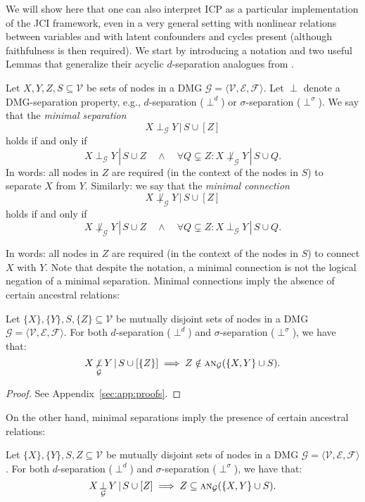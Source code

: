 \documentclass[twoside,11pt]{article}
\DeclareMathOperator*{\SEP}{\perp}
\DeclareMathOperator*{\nSEP}{\not\perp}
\newcommand\sep[4]{{#1} \SEP_{#4} {#2} \given {#3}}
\newcommand\con[4]{{#1} \nSEP_{#4} {#2} \given {#3}}
\newcommand\C[1]{\mathcal{#1}}
\newcommand\mathbfsc[1]{\text{\normalfont\scshape#1}}
\newcommand\ansub[2]{\mathbfsc{an}_{#1}(#2)}
\newcommand\given{\,|\,}
\begin{document}
We will show here that one can also interpret ICP as a particular implementation of the JCI framework,
even in a very general setting with nonlinear relations between variables and with latent confounders
and cycles present (although faithfulness is then required).
We start by introducing a notation and two useful Lemmas that generalize their acyclic $d$-separation
analogues from \citep{ClaassenHeskes2011}.
\begin{definition}
Let $X,Y,Z,S \subseteq \C{V}$ be sets of nodes in a DMG $\C{G} = \langle \C{V},\C{E},\C{F} \rangle$. 
Let $\SEP$ denote a DMG-separation property,
  e.g., $d$-separation ($\SEP^d$) or $\sigma$-separation ($\SEP^\sigma$). We say that the \emph{minimal separation}
  $$\sep{X}{Y}{S \cup [Z]}{\C{G}}$$
holds if and only if
  $$\sep{X}{Y}{S \cup Z}{\C{G}} \quad\land\quad \forall Q \subsetneq Z: \con{X}{Y}{S \cup Q}{\C{G}}.$$
In words: all nodes in $Z$ are required (in the context of the nodes in $S$) to separate $X$ from $Y$.
Similarly: we say that the \emph{minimal connection}
  $$\con{X}{Y}{S \cup [Z]}{\C{G}}$$
holds if and only if
  $$\con{X}{Y}{S \cup Z}{\C{G}}\quad\land\quad \forall Q \subsetneq Z: \sep{X}{Y}{S \cup Q}{\C{G}}.$$
\end{definition}
In words: all nodes in $Z$ are required (in the context of the nodes in $S$) to connect $X$ with $Y$.
Note that despite the notation, a minimal connection is not the logical negation of a minimal separation.
Minimal connections imply the absence of certain ancestral relations:
\newcommand\cmdLemmaMinCon{%
Let $\{X\},\{Y\},S,\{Z\} \subseteq \C{V}$ be mutually disjoint sets of nodes in a DMG $\C{G} = \langle \C{V},\C{E},\C{F} \rangle$.
For both $d$-separation ($\SEP^d$) and $\sigma$-separation ($\SEP^\sigma$), we have that:
$$\con{X}{Y}{S \cup [\{Z\}]}{\C{G}} \implies Z \notin \ansub{\C{G}}{\{X, Y\} \cup S}.$$
}
\begin{lemma}\label{lemm:min_con}
\cmdLemmaMinCon
\end{lemma}
\begin{proof}
  See Appendix~\ref{sec:app:proofs}.
\end{proof}
On the other hand, minimal separations imply the presence of certain ancestral relations:
\newcommand\cmdLemmaMinSep{%
Let $\{X\},\{Y\},S,Z \subseteq \C{V}$ be mutually disjoint sets of nodes in a DMG $\C{G} = \langle \C{V},\C{E},\C{F} \rangle$.
For both $d$-separation ($\SEP^d$) and $\sigma$-separation ($\SEP^\sigma$), we have that:
$$\sep{X}{Y}{S \cup [Z]}{\C{G}} \implies Z \subseteq \ansub{\C{G}}{\{X, Y\} \cup S}.$$
}
\begin{lemma}\label{lemm:min_sep}
\cmdLemmaMinSep
\end{lemma}
\end{document}
